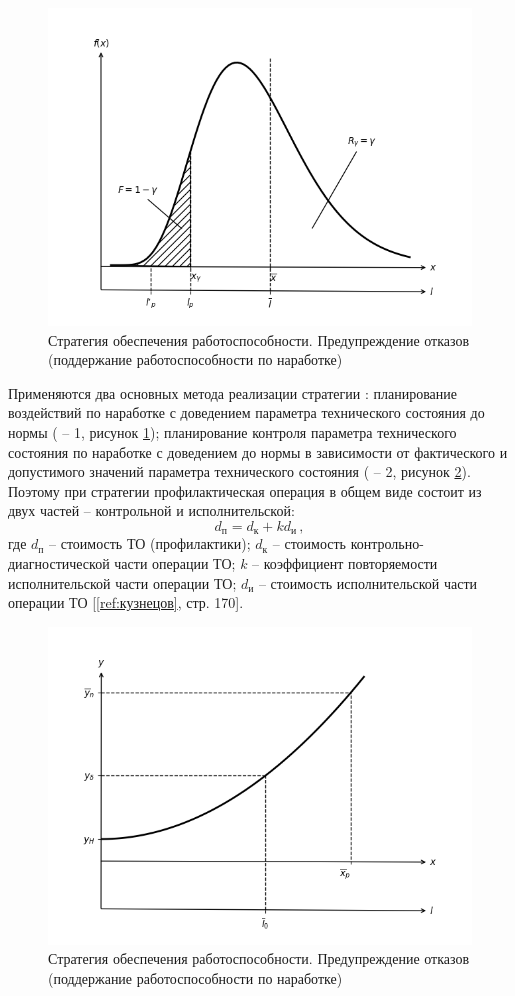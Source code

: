 \documentclass[../nirs.tex]{subfiles}
\begin{document}
\begin{figure}[H]
\centering
\includegraphics[keepaspectratio,width=\textwidth]{./images/pdf.b.png}
\caption{Стратегия обеспечения работоспособности. Предупреждение отказов
    (поддержание работоспособности по наработке)}
\label{fig:pdf.b}
\end{figure}

Применяются два основных метода реализации стратегии : планирование
воздействий по наработке с доведением параметра технического состояния до нормы
( -- 1, рисунок \ref{fig:pdf.b}); планирование контроля параметра
технического состояния по наработке с доведением до нормы в зависимости от
фактического и допустимого значений параметра технического состояния ( --
2, рисунок \ref{fig:pdf.c}). Поэтому при стратегии  профилактическая
операция в общем виде состоит из двух частей -- контрольной и исполнительской:
\begin{equation*}
    d_{\text{п}} = d_{\text{к}} + k d_{\text{и}}\,,
\end{equation*}
где $d_{\text{п}}$ -- стоимость ТО (профилактики); $d_{\text{к}}$ -- стоимость
контрольно-диагностической части операции ТО; $k$ -- коэффициент повторяемости
исполнительской части операции ТО; $d_{\text{и}}$ -- стоимость исполнительской
части операции ТО [\ref{ref:кузнецов}, стр. 170].

\begin{figure}[H]
\centering
\includegraphics[keepaspectratio,width=\textwidth]{./images/pdf.c.png}
\caption{Стратегия обеспечения работоспособности. Предупреждение отказов
    (поддержание работоспособности по наработке)}
\label{fig:pdf.c}
\end{figure}
\end{document}
